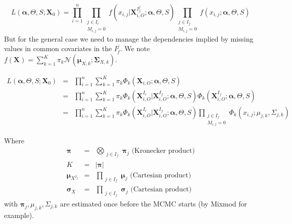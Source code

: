 \documentclass[11pt,a4paper]{report}
\begin{document}
		\begin{equation}
		L(\boldsymbol{\alpha},\Theta,S;\boldsymbol{X}_0)=\prod_{i=1}^n\prod_{\substack{j \in I_r \\ M_{i,j}=0}}f(x_{i,j}|\boldsymbol{X}^{I_f^j}_{i,O};\boldsymbol{\alpha},\Theta,S)\prod_{\substack{j \in I_f \\ M_{i,j}=0}}f(x_{i,j};\boldsymbol{\alpha},\Theta,S) \label{simplemisslik}
\end{equation}		 
		But for the general case we need to manage the dependencies implied by missing values in common covariates in the $I_f^j$.
		We note $f(\boldsymbol{X})=\sum_{k=1}^K\pi_k \mathcal{N}(\boldsymbol{\mu}_{X,k};\boldsymbol{\Sigma}_{X,k})$.
		
\begin{eqnarray}
L(\boldsymbol{\alpha},\Theta,S;\boldsymbol{X}_0)&=&\prod_{i=1}^n\sum_{k=1}^{K} \pi_{k} \Phi_k(\boldsymbol{X}_{i,O};\boldsymbol{\alpha},\Theta,S)\\
&=&\prod_{i=1}^n\sum_{k=1}^{K} \pi_{k} \Phi_k(\boldsymbol{X}_{i,O}^{I_r}|\boldsymbol{X}_{i,O}^{I_f};\boldsymbol{\alpha},\Theta,S)\Phi_k(\boldsymbol{X}_{i,O}^{I_f};\boldsymbol{\alpha},\Theta,S)\\
&=&\prod_{i=1}^n\sum_{k=1}^{K} \pi_{k} \Phi_k(\boldsymbol{X}_{i,O}^{I_r}|\boldsymbol{X}_{i,O}^{I_f};\boldsymbol{\alpha},\Theta,S)\prod_{\substack{j \in I_f \\ M_{i,j}=0}}\Phi_k(x_{i,j};\mu_{j,k},\Sigma_{j,k})
\end{eqnarray}		

Where	
\begin{eqnarray}
	\boldsymbol{\pi}&=&\bigotimes_{\substack{j \in I_f }} \boldsymbol{\pi}_j \textrm{ (Kronecker product)}\\
	K&=& |\boldsymbol{\pi}| \\
	\boldsymbol{\mu}_{X^{I_f}}&=&  \prod_{\substack{j \in I_f}}\boldsymbol{\mu}_{j} \textrm{ (Cartesian product) } \\	
	\boldsymbol{\sigma}_{X}&=&\prod_{\substack{j \in I_f}}\boldsymbol{\sigma}_{j} \textrm{ (Cartesian product) }
\end{eqnarray}
		with $ \boldsymbol{\pi}_j, \mu_{j,k},\Sigma_{j,k}$ are estimated once before the MCMC starts (by Mixmod for example).
		
\end{document}
